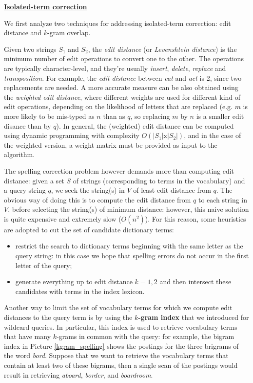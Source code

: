 \textbf{\underline{Isolated-term correction}}

We first analyze two techniques for addressing isolated-term correction: edit distance and $k$-gram overlap. 

Given two strings $S_1$ and $S_2$, the \textit{edit distance} (or \textit{Levenshtein distance}) is the minimum number of edit operations to convert one to the other. The operations are typically character-level, and they're usually \textit{insert}, \textit{delete}, \textit{replace} and \textit{transposition}. For example, the \textit{edit distance} between \textit{cat} and \textit{act} is 2, since two replacements are needed. A more accurate measure can be also obtained using the \textit{weighted edit distance}, where different weights are used for different kind of edit operations, depending on the likelihood of letters that are replaced (e.g. $m$ is more likely to be mis-typed as $n$ than as $q$, so replacing $m$ by $n$ is a smaller edit disance than by $q$). In general, the (weighted) edit distance can be computed using dynamic programming with complexity $O(|S_1| \text{x} |S_2|)$, and in the case of the weighted version, a weight matrix must be provided as input to the algorithm.

The spelling correction problem however demands more than computing edit distance: given a set $S$ of strings (corresponding to terms in the vocabulary) and a query string $q$, we seek the string(s) in $V$ of least edit distance from $q$. The obvious way of doing this is to compute the edit distance from $q$ to each string in $V$, before selecting the string(s) of minimum distance: however, this naive solution is quite expensive and extremely slow ($O(n^2)$). For this reason, some heuristics are adopted to cut the set of candidate dictionary terms: 

\begin{itemize}
    \item restrict the search to dictionary terms beginning with the same letter as the query string: in this case we hope that spelling errors do not occur in the first letter of the query;
    \item generate everything up to edit distance $k = 1,2$ and then intersect these candidates with terms in the index lexicon.
\end{itemize}

Another way to limit the set of vocabulary terms for which we compute edit distances to the query term is by using the \textbf{$k$-gram index} that we introduced for wildcard queries. In particular, this index is used to retrieve vocabulary terms that have many $k$-grams in common with the query: for example, the bigram index in Picture \ref{kgram_spelling} shows the postings for the three brigrams of the word \textit{bord}. Suppose that we want to retrieve the vocabulary terms that contain at least two of these bigrams, then a single scan of the postings would result in retrieving \textit{aboard}, \textit{border}, and \textit{boardroom}.

